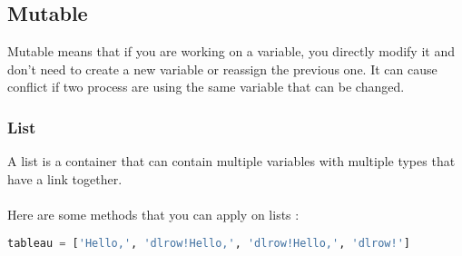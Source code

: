 \documentclass[a4paper, 12pt, titlepage]{scrartcl} %
\begin{document}
\subsection{Mutable}
Mutable means that if you are working on a variable, you directly modify it and don't need to create a new variable or reassign the previous one. It can cause conflict if two process are using the same variable that can be changed.\newline

\subsubsection{List}
A list is a container that can contain multiple variables with multiple types that have a link together.\\ \\
Here are some methods that you can apply on lists : 

\begin{lstlisting}[language=Python]
tableau = ['Hello,', 'dlrow!Hello,', 'dlrow!Hello,', 'dlrow!']
\end{lstlisting} \vspace{5mm}
\end{document}
